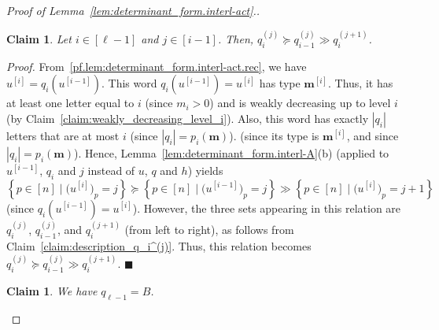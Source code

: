 \documentclass[reqno]{amsart}
\newcommand{\0}{\phantom{c}}
\newcommand{\mm}{\mathbf{m}}
\newenvironment{subproof}{\textit{Proof.} }{\hfill$\blacksquare$ \medskip}
\newenvironment{verlong}{}{}
\newenvironment{vershort}{}{}
\newcommand{\set}[1]{\left\{ #1 \right\}}
\newcommand{\abs}[1]{\left| #1 \right|}
\newcommand{\ive}[1]{\left[ #1 \right]}
\theoremstyle{plain}
\newtheorem{claim}[thm]{Claim}
\theoremstyle{definition}
\numberwithin{equation}{section}
\begin{document}
\begin{proof}[Proof of Lemma~\ref{lem:determinant_form.interl-act}.]
\begin{claim}
\label{claim:interlacing_subqueues}
Let $i\in \ive{\ell-1}$ and $j\in \ive{i-1}$.
Then, $q_i^{(j)} \succeq q_{i-1}^{(j)} \gg q_i^{(j+1)}$.
\end{claim}

\begin{subproof}
From~\eqref{pf.lem:determinant_form.interl-act.rec}, we have $u^{\left[  i\right]} = q_i( u^{\left[  i-1\right]  } )$.
This word $q_i( u^{\left[  i-1\right]} ) = u^{\left[  i\right]}$ has type $\mm^{[i]}$.
Thus, it has at least one letter equal to $i$ (since $m_i > 0$)
and is weakly decreasing up to level $i$ (by Claim~\ref{claim:weakly_decreasing_level_i}).
Also, this word has exactly $\abs{q_i}$ letters that are at most $i$
\begin{vershort}
(since $\abs{q_i} = p_i(\mm)$).
\end{vershort}
\begin{verlong}
(since its type is $\mm^{[i]}$, and since $\abs{q_i} = p_i(\mm)$).
\end{verlong}
Hence, Lemma~\ref{lem:determinant_form.interl-A}(b) (applied to $u^{\left[i-1\right]}$, $q_i$ and $j$ instead of $u$, $q$ and $h$)
yields
\[
\set{ p \in \ive{n} \mid \bigl( u^{\left[i\right]} \bigr)_p = j }
\succeq
\set{ p \in \ive{n} \mid \bigl( u^{\left[i-1\right]} \bigr)_p = j }
\gg
\set{ p \in \ive{n} \mid \bigl( u^{\left[i\right]} \bigr)_p = j+1 }
\]
(since $q_i( u^{\left[  i-1\right]} ) = u^{\left[  i\right]}$).
However, the three sets appearing in this relation are $q_i^{(j)}$, $q_{i-1}^{(j)}$, and $q_i^{(j+1)}$ (from left to right), as follows from Claim~\ref{claim:description_q_i^(j)}.
Thus, this relation becomes $q_i^{(j)} \succeq q_{i-1}^{(j)} \gg q_i^{(j+1)}$.
\end{subproof}

\begin{claim}
\label{claim:the_last_queue}
We have $q_{\ell-1} = B$.
\end{claim}


\end{proof}
\end{document}
